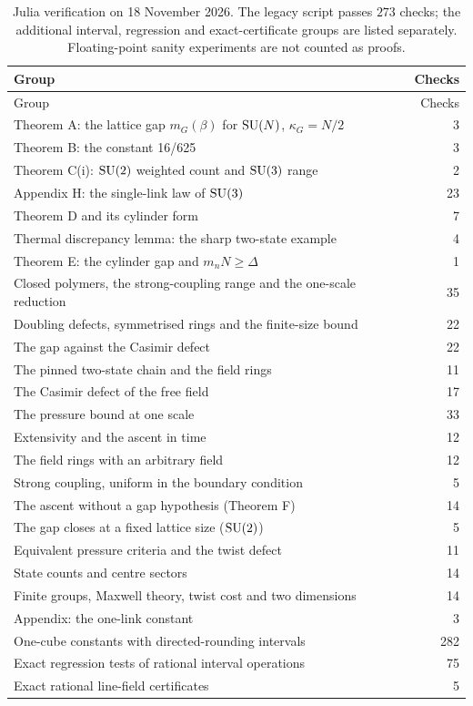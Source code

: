 {
\footnotesize
\setlength{\LTcapwidth}{\textwidth}
\begin{longtable}{@{}>{\raggedright\arraybackslash}p{}r@{}}
\caption{Julia verification on 18 November 2026. The legacy script passes $273$ checks; the additional interval, regression and exact-certificate groups are listed separately. Floating-point sanity experiments are not counted as proofs.}\label{tab:julia}\\
\toprule
Group & Checks\\
\midrule
\endfirsthead
\toprule
Group & Checks\\
\midrule
\endhead
\bottomrule
\endfoot
\bottomrule
\endlastfoot
Theorem A: the lattice gap $m_G(\beta)$ for $\mathrm{SU}(N)$, $\kappa_G=N/2$ & 3\\
Theorem B: the constant 16/625 & 3\\
Theorem C(i): $\mathrm{SU}(2)$ weighted count and $\mathrm{SU}(3)$ range & 2\\
Appendix H: the single-link law of $\mathrm{SU}(3)$ & 23\\
Theorem D and its cylinder form & 7\\
Thermal discrepancy lemma: the sharp two-state example & 4\\
Theorem E: the cylinder gap and $m_nN\ge\Delta$ & 1\\
Closed polymers, the strong-coupling range and the one-scale reduction & 35\\
Doubling defects, symmetrised rings and the finite-size bound & 22\\
The gap against the Casimir defect & 22\\
The pinned two-state chain and the field rings & 11\\
The Casimir defect of the free field & 17\\
The pressure bound at one scale & 33\\
Extensivity and the ascent in time & 12\\
The field rings with an arbitrary field & 12\\
Strong coupling, uniform in the boundary condition & 5\\
The ascent without a gap hypothesis (Theorem F) & 14\\
The gap closes at a fixed lattice size ($\mathrm{SU}(2)$) & 5\\
Equivalent pressure criteria and the twist defect & 11\\
State counts and centre sectors & 14\\
Finite groups, Maxwell theory, twist cost and two dimensions & 14\\
Appendix: the one-link constant & 3\\
One-cube constants with directed-rounding intervals & 282\\
Exact regression tests of rational interval operations & 75\\
Exact rational line-field certificates & 5\\
\end{longtable}
}
